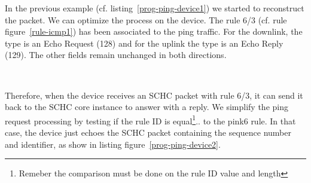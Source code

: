 In the previous example (cf. listing~\vref{prog-ping-device1}) we started to reconstruct the packet. We can optimize the process on the device. The rule 6/3 (cf. rule figure~\vref{rule-icmp1}) has been associated to the ping traffic. For the downlink, the type is an Echo Request (128) and for the uplink the type is an Echo Reply (129). The other fields remain unchanged in both directions.


~~

Therefore, when the device receives an SCHC packet with rule 6/3, it can send it back to the SCHC core instance to answer with a reply.
We simplify the ping request processing by testing if the rule ID is equal\footnote{Remeber the comparison must be done on the rule ID value and length}.. to the pink6 rule. In that case, the device just echoes the SCHC packet containing the sequence number and identifier, as show in listing figure~\vref{prog-ping-device2}.

